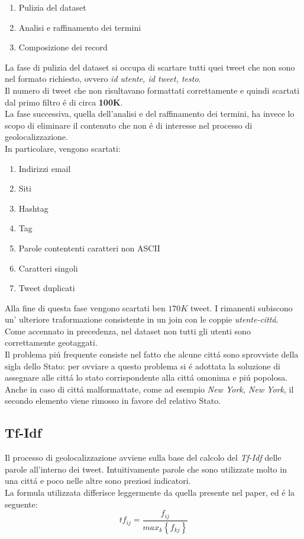 \documentclass[twocolumn,10pt]{asme2ej}
\begin{document}
\begin{enumerate}
\item Pulizia del dataset
\item Analisi e raffinamento dei termini
\item Composizione dei record 
\end{enumerate}


La fase di pulizia del dataset si occupa di scartare tutti quei tweet che non sono nel formato richiesto, ovvero \textit{id utente, id tweet, testo}. \\Il numero di tweet che non risultavano formattati correttamente e quindi scartati dal primo filtro \'e di circa \textbf{100K}.\\La fase successiva, quella dell'analisi e del raffinamento dei termini, ha invece lo scopo di eliminare il contenuto che non \'e di interesse nel processo di geolocalizzazione. \\In particolare, vengono scartati:
\begin{enumerate}
\item Indirizzi email 
\item Siti
\item Hashtag
\item Tag
\item Parole contententi caratteri non ASCII
\item Caratteri singoli
\item Tweet duplicati
\end{enumerate}

Alla fine di questa fase vengono scartati ben $170K$ tweet. I rimanenti subiscono un' ulteriore traformazione consistente in un join con  le coppie \textit{utente-citt\'a}. \\Come accennato in precedenza, nel dataset non tutti gli utenti sono correttamente geotaggati.\\ Il problema pi\'u frequente consiste nel fatto che alcune citt\'a sono sprovviste della sigla dello Stato: per ovviare a questo problema si \'e adottata la soluzione di assegnare alle citt\'a lo stato corrispondente alla citt\'a omonima e pi\'u popolosa. Anche in caso di citt\'a malformattate, come ad esempio  \textit{New York, New York}, il secondo elemento viene rimosso in favore del relativo Stato. 

\subsection{Tf-Idf}

Il processo di geolocalizzazione avviene sulla base del calcolo del \textit{Tf-Idf} delle parole all'interno dei tweet. Intuitivamente parole che sono utilizzate molto in una citt\'a e poco nelle altre sono  preziosi indicatori. \\La formula utilizzata differisce leggermente da quella presente nel paper, ed \'e la seguente: $$tf_{ij}=	\frac{f_{ij}}{max_k	\left \{ f_{kj} \right \}	}$$
\end{document}
